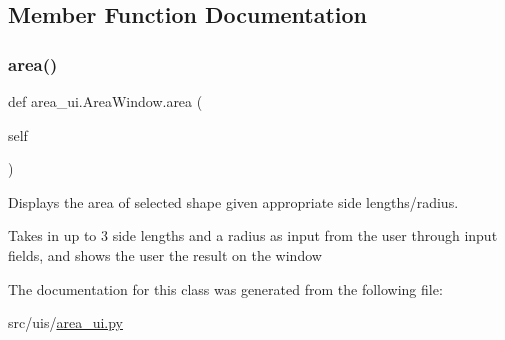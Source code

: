 \subsection{Member Function Documentation}
\mbox{\label{classarea__ui_1_1_area_window_af95844b38370da348b28e9b1238467ad}} 
\subsubsection{\texorpdfstring{area()}{area()}}
{\footnotesize\ttfamily def area\+\_\+ui.\+Area\+Window.\+area (\begin{DoxyParamCaption}\item[{}]{self }\end{DoxyParamCaption})}



Displays the area of selected shape given appropriate side lengths/radius. 

Takes in up to 3 side lengths and a radius as input from the user through input fields, and shows the user the result on the window 

The documentation for this class was generated from the following file\+:\begin{DoxyCompactItemize}
\item 
src/uis/\hyperlink{area__ui_8py}{area\+\_\+ui.\+py}\end{DoxyCompactItemize}
